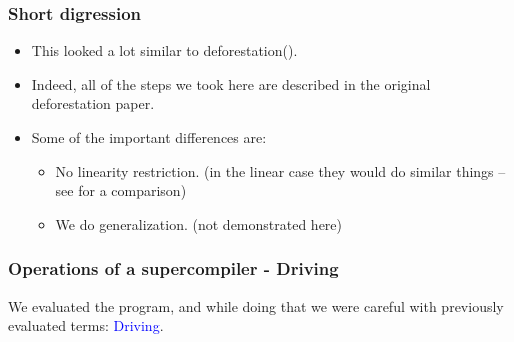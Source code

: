 \documentclass{beamer}
\begin{document}
\begin{frame}

    \frametitle{Short digression}

    \begin{itemize}[<+->]

        \item[] This looked a lot similar to deforestation(\citet{deforestation}).
        \item[] Indeed, all of the steps we took here are described in the
            original deforestation paper.
        \item[]
            Some of the important differences are:
            \begin{itemize}[<+->]
                \item No linearity restriction. (in the linear case they would
                    do similar things -- see \citet{towardsunifying} for a
                    comparison)
                \item We do generalization. (not demonstrated here)
            \end{itemize}

    \end{itemize}

\end{frame}

\begin{frame}

    \frametitle{Operations of a supercompiler - Driving}

    We evaluated the program, and while doing that we were careful
    with previously evaluated terms: \textcolor{blue}{Driving}.

\end{frame}
\end{document}
